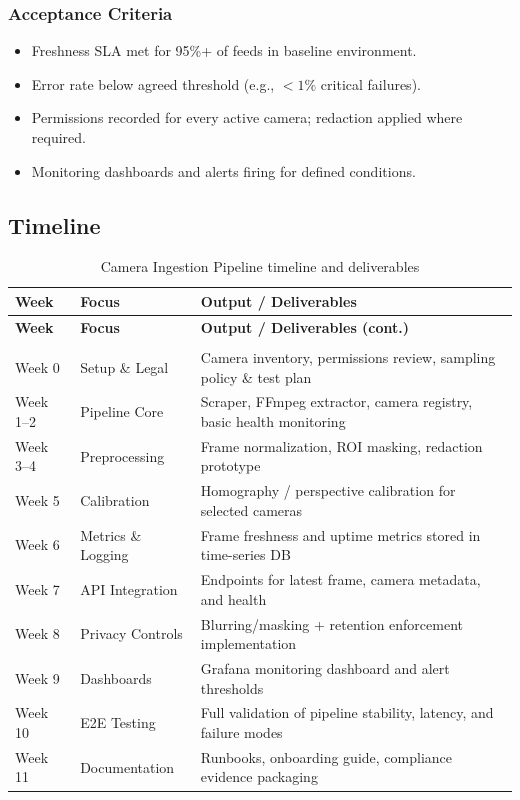 \subsubsection{Acceptance Criteria}
\begin{itemize}
  \item Freshness SLA met for 95\%+ of feeds in baseline environment.
  \item Error rate below agreed threshold (e.g., $<1\%$ critical failures).
  \item Permissions recorded for every active camera; redaction applied where required.
  \item Monitoring dashboards and alerts firing for defined conditions.
\end{itemize}

\subsection{Timeline}
\renewcommand{\arraystretch}{1.15}
\begin{longtable}{|>{\raggedright\arraybackslash}p{}|>{\raggedright\arraybackslash}p{}|>{\raggedright\arraybackslash}p{}|}
\caption{Camera Ingestion Pipeline timeline and deliverables}\label{tab:camera-ingestion-timeline}\\
\hline
									\textbf{Week} & \textbf{Focus} & \textbf{Output / Deliverables} \\
\hline
\endfirsthead
\hline
									\textbf{Week} & \textbf{Focus} & \textbf{Output / Deliverables (cont.)} \\
\hline
\endhead
\hline
\multicolumn{3}{r}{\small Continued on next page} \\
\hline
\endfoot
\hline
\endlastfoot
Week 0 & Setup \& Legal & Camera inventory, permissions review, sampling policy \& test plan \\
\hline
Week 1--2 & Pipeline Core & Scraper, FFmpeg extractor, camera registry, basic health monitoring \\
\hline
Week 3--4 & Preprocessing & Frame normalization, ROI masking, redaction prototype \\
\hline
Week 5 & Calibration & Homography / perspective calibration for selected cameras \\
\hline
Week 6 & Metrics \& Logging & Frame freshness and uptime metrics stored in time-series DB \\
\hline
Week 7 & API Integration & Endpoints for latest frame, camera metadata, and health \\
\hline
Week 8 & Privacy Controls & Blurring/masking + retention enforcement implementation \\
\hline
Week 9 & Dashboards & Grafana monitoring dashboard and alert thresholds \\
\hline
Week 10 & E2E Testing & Full validation of pipeline stability, latency, and failure modes \\
\hline
Week 11 & Documentation & Runbooks, onboarding guide, compliance evidence packaging \\
\hline
\end{longtable}

